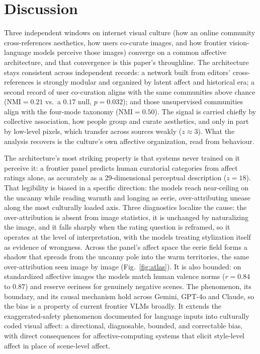 \documentclass[11pt]{article}
\begin{document}
\section{Discussion}

Three independent windows on internet visual culture (how an online community cross-references
aesthetics, how users co-curate images, and how frontier vision-language models perceive those
images) converge on a common affective architecture, and that convergence is this paper's
throughline. The architecture stays consistent across independent records: a network built from
editors' cross-references is strongly modular and organized by latent affect and historical era;
a second record of user co-curation aligns with the same communities above chance
($\mathrm{NMI}=0.21$ vs.\ a $0.17$ null, $p=0.032$); and those unsupervised communities align with the four-mode taxonomy
($\mathrm{NMI}=0.50$). The signal is carried chiefly by collective association, how people
group and curate aesthetics, and only in part by low-level pixels, which transfer across sources
weakly ($z\!\approx\!3$). What the analysis recovers is the culture's own affective organization,
read from behaviour.

The architecture's most striking property is that systems never trained on it perceive it: a
frontier panel predicts human curatorial categories from affect ratings alone, as accurately as a
29-dimensional perceptual description ($z=18$). That legibility is biased in a
specific direction: the models reach near-ceiling on the uncanny while reading warmth and longing
as eerie, over-attributing unease along the most culturally loaded axis. Three diagnostics localize
the cause: the over-attribution is absent from image statistics, it is unchanged by naturalizing
the image, and it falls sharply when the rating question is reframed, so it operates at the level
of interpretation, with the models treating stylization itself as evidence of wrongness. Across the
panel's affect space the eerie field forms a shadow that spreads from the uncanny pole into the warm
territories, the same over-attribution seen image by image (Fig.~\ref{fig:atlas}). It is
also bounded: on standardized affective images the models match human valence norms ($r=0.84$ to
$0.87$) and reserve eeriness for genuinely negative scenes. The phenomenon, its boundary, and its
causal mechanism hold across Gemini, GPT-4o and Claude, so the bias is a property of current
frontier VLMs broadly. It extends the exaggerated-safety phenomenon documented for language
inputs \citep{rottger2024} into culturally coded visual affect: a directional, diagnosable,
bounded, and correctable bias, with direct consequences for affective-computing systems that
elicit style-level affect in place of scene-level affect.
\end{document}
